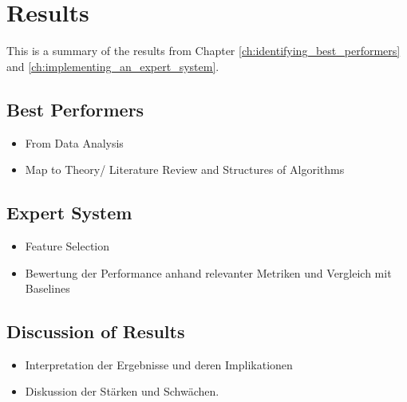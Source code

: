 \chapter{Results}
This is a summary of the results from Chapter \ref{ch:identifying_best_performers} and \ref{ch:implementing_an_expert_system}.

\section{Best Performers}
\begin{itemize}
    \item From Data Analysis
    \item Map to Theory/ Literature Review and Structures of Algorithms
\end{itemize}


\section{Expert System}
\begin{itemize}
    \item Feature Selection
    \item Bewertung der Performance anhand relevanter Metriken und Vergleich mit Baselines
\end{itemize}

\section{Discussion of Results}
\begin{itemize}
    \item Interpretation der Ergebnisse und deren Implikationen
    \item Diskussion der Stärken und Schwächen.
\end{itemize}

